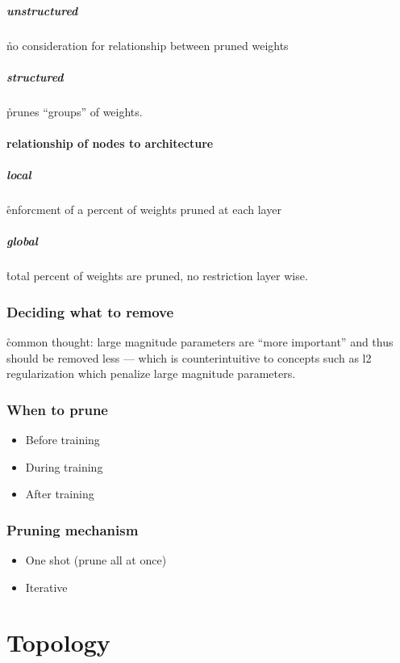 \subparagraph{unstructured}

\r{no consideration for relationship between pruned weights}

\subparagraph{structured}

\r{prunes ``groups'' of weights.}

\paragraph{relationship of nodes to architecture}

\subparagraph{local}

\r{enforcment of a percent of weights pruned at each layer}

\subparagraph{global}

\r{total percent of weights are pruned, no restriction layer wise.}

\subsubsection{Deciding what to remove}

\r{common thought: large magnitude parameters are ``more important'' and thus should be removed less --- which is counterintuitive to concepts such as l2 regularization which penalize large magnitude parameters.}


\subsubsection{When to prune}

\begin{itemize}[noitemsep,topsep=0pt]
	\item Before training
	\item During training
	\item After training
\end{itemize}

\subsubsection{Pruning mechanism}

\begin{itemize}[noitemsep,topsep=0pt]
	\item One shot (prune all at once)
	\item Iterative
\end{itemize}

\section{Topology}

